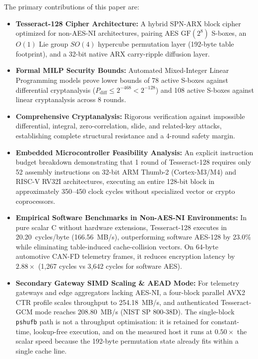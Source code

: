 \documentclass[review,12pt]{elsarticle}
\begin{document}
The primary contributions of this paper are:
\begin{itemize}
    \item \textbf{Tesseract-128 Cipher Architecture:} A hybrid SPN-ARX block cipher optimized for non-AES-NI architectures, pairing AES $\text{GF}(2^8)$ S-boxes, an $O(1)$ Lie group $SO(4)$ hypercube permutation layer (192-byte table footprint), and a 32-bit native ARX carry-ripple diffusion layer.
    \item \textbf{Formal MILP Security Bounds:} Automated Mixed-Integer Linear Programming models prove lower bounds of 78 active S-boxes against differential cryptanalysis ($P_{\text{diff}} \le 2^{-468} < 2^{-128}$) and 108 active S-boxes against linear cryptanalysis across 8 rounds.
    \item \textbf{Comprehensive Cryptanalysis:} Rigorous verification against impossible differential, integral, zero-correlation, slide, and related-key attacks, establishing complete structural resistance and a 4-round safety margin.
    \item \textbf{Embedded Microcontroller Feasibility Analysis:} An explicit instruction budget breakdown demonstrating that 1 round of Tesseract-128 requires only 52 assembly instructions on 32-bit ARM Thumb-2 (Cortex-M3/M4) and RISC-V RV32I architectures, executing an entire 128-bit block in approximately 350--450 clock cycles without specialized vector or crypto coprocessors.
    \item \textbf{Empirical Software Benchmarks in Non-AES-NI Environments:} In pure scalar C without hardware extensions, Tesseract-128 executes in 20.20~cycles/byte (166.56~MB/s), outperforming software AES-128 by 23.0\% while eliminating table-induced cache-collision vectors. On 64-byte automotive CAN-FD telemetry frames, it reduces encryption latency by $2.88\times$ (1,267 cycles vs 3,642 cycles for software AES).
    \item \textbf{Secondary Gateway SIMD Scaling \& AEAD Mode:} For telemetry gateways and edge aggregators lacking AES-NI, a four-block parallel AVX2 CTR profile scales throughput to 254.18~MB/s, and authenticated Tesseract-GCM mode reaches 208.80~MB/s (NIST SP 800-38D). The single-block \texttt{pshufb} path is not a throughput optimisation: it is retained for constant-time, lookup-free execution, and on the measured host it runs at $0.50\times$ the scalar speed because the 192-byte permutation state already fits within a single cache line.
\end{itemize}
\end{document}
